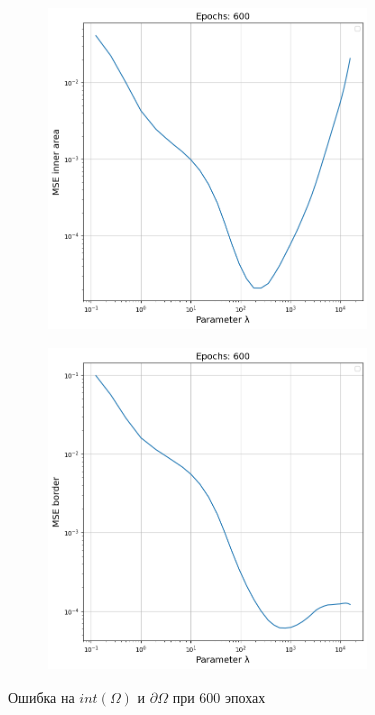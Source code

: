\begin{figure}[ht!]
    \centering
    \begin{subfigure}{0.45\textwidth}{
        \includegraphics[height=8.5cm, keepaspectratio]{images/8.png}
    }
    \end{subfigure}
    \hfill
    \begin{subfigure}{0.45\textwidth}{
        \includegraphics[height=8.5cm, keepaspectratio]{images/9.png}
    }
    \end{subfigure}
    \caption{Ошибка на $int(\Omega)$ и $\partial \Omega$ при 600 эпохах}
\end{figure}

